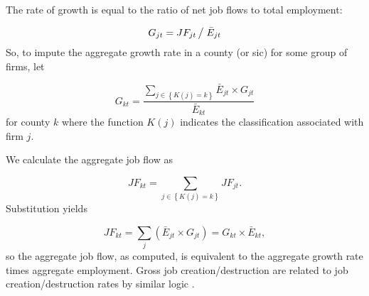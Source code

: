 The rate of growth is equal to the ratio of net job flows to total
employment:

\begin{equation}
G_{jt}={JF_{jt}}\left/ {\vphantom {{JF_{jt} } {\bar {E}_{jt} }}}\right. {%
\bar{E}_{jt}}
\end{equation}%
So, to impute the aggregate growth rate in a county (or sic) for some group
of firms, let

\begin{equation}
G_{kt}=\frac{\sum\limits_{j\in \left\{ {K(j)=k}\right\} }{\bar{E}_{jt}\times
G_{jt}}}{\bar{E}_{kt}}
\end{equation}%
for county $k$ where the function $K(j)$ indicates the classification
associated with firm $j$.

We calculate the aggregate job flow as

\begin{equation}
JF_{kt}=\sum\limits_{j\in \left\{ {K(j)=k}\right\} }{JF_{jt}}.
\end{equation}%
Substitution yields

\begin{equation}
JF_{kt}=\sum\limits_{j}{(\bar{E}_{jt}\times G_{jt})}=G_{kt}\times \bar{E}%
_{kt},
\end{equation}%
so the aggregate job flow, as computed, is equivalent to the aggregate
growth rate times aggregate employment. Gross job creation/destruction are
related to job creation/destruction rates by similar logic \cite[p. 189 for
details]{DavisHaltiwangerSchuh}.

% 

